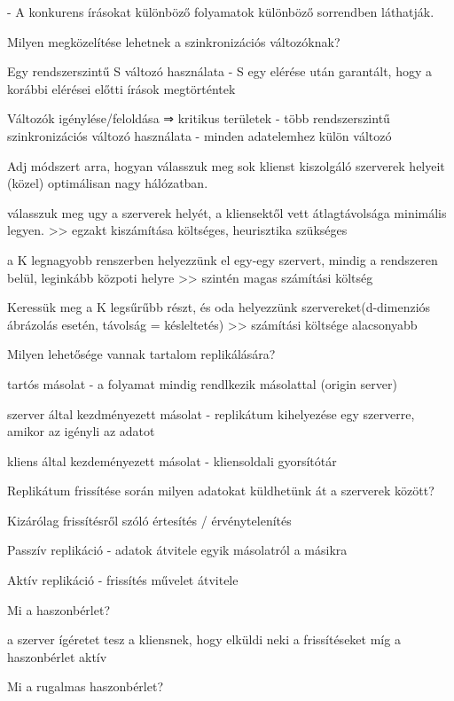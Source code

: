 \documentclass[12pt]{article}
\begin{document}
\begin{description}[style=unboxed]
        - A konkurens írásokat különböző folyamatok különböző sorrendben láthatják.
    \item  Milyen megközelítése lehetnek a szinkronizációs változóknak?
    \item Egy rendszerszintű S változó használata
        - S egy elérése után garantált, hogy a korábbi elérései előtti írások megtörténtek
    \item Változók  igénylése/feloldása ⇒ kritikus területek
        - több rendszerszintű szinkronizációs változó használata
        - minden adatelemhez külön változó
    \item  Adj módszert arra, hogyan válasszuk meg sok klienst kiszolgáló szerverek helyeit (közel) optimálisan nagy hálózatban.
    \item válasszuk meg ugy a szerverek helyét, a kliensektől vett átlagtávolsága minimális legyen.
        >> egzakt kiszámítása költséges, heurisztika szükséges
    \item a K legnagyobb renszerben helyezzünk el egy-egy szervert, mindig a rendszeren belül, leginkább közpoti helyre
        >>  szintén magas számítási költség
    \item Keressük meg a K legsűrűbb részt, és oda helyezzünk szervereket(d-dimenziós ábrázolás esetén, távolság = késleltetés)
        >> számítási költsége alacsonyabb	
    \item  Milyen lehetősége vannak tartalom replikálására?
    \item tartós másolat
        - a folyamat mindig rendlkezik másolattal (origin server)
    \item szerver által kezdményezett másolat
        - replikátum kihelyezése egy szerverre, amikor az igényli az adatot
    \item kliens által kezdeményezett másolat
        - kliensoldali gyorsítótár
    \item  Replikátum frissítése során milyen adatokat küldhetünk át a szerverek között?
    \item Kizárólag frissítésről szóló értesítés / érvénytelenítés
    \item Passzív replikáció
        - adatok átvitele egyik másolatról a másikra
    \item Aktív replikáció
        - frissítés művelet átvitele
    \item  Mi a haszonbérlet?	
    \item a szerver ígéretet tesz a kliensnek, hogy elküldi neki a frissítéseket míg a haszonbérlet aktív
    \item  Mi a rugalmas haszonbérlet?

\end{description}
\end{document}
